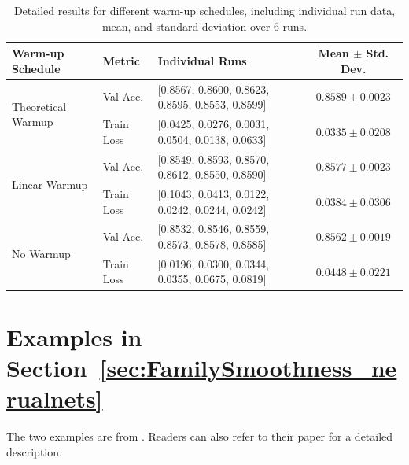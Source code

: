 \documentclass{article}
\begin{document}
\begin{table}[h]
    \small
    \centering
    \begin{tabular}{lllc}
    \toprule
    Warm-up Schedule & Metric & Individual Runs & Mean $\pm$ Std. Dev. \\
    \midrule
    \multirow{2}{*}{Theoretical Warmup} & Val Acc. & [0.8567, 0.8600, 0.8623, 0.8595, 0.8553, 0.8599] & $0.8589 \pm 0.0023$ \\
    & Train Loss & [0.0425, 0.0276, 0.0031, 0.0504, 0.0138, 0.0633] & $0.0335 \pm 0.0208$ \\
    \midrule
    \multirow{2}{*}{Linear Warmup} & Val Acc. & [0.8549, 0.8593, 0.8570, 0.8612, 0.8550, 0.8590] & $0.8577 \pm 0.0023$ \\
    & Train Loss & [0.1043, 0.0413, 0.0122, 0.0242, 0.0244, 0.0242] & $0.0384 \pm 0.0306$ \\
    \midrule
    \multirow{2}{*}{No Warmup} & Val Acc. & [0.8532, 0.8546, 0.8559, 0.8573, 0.8578, 0.8585] & $0.8562 \pm 0.0019$ \\
    & Train Loss & [0.0196, 0.0300, 0.0344, 0.0355, 0.0675, 0.0819] & $0.0448 \pm 0.0221$ \\
    \bottomrule
    \end{tabular}
    \caption{Detailed results for different warm-up schedules, including individual run data, mean, and standard deviation over $6$ runs.}
    \label{tab:full_accuracy_results_resnet}
\end{table}


\section{Examples in Section~\ref{sec:FamilySmoothness_nerualnets}}\label{apx:examples}
The two examples are from \cite{patel2022global}. Readers can also refer to their paper for a detailed description.
\end{document}
